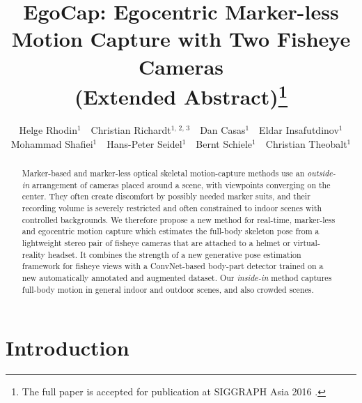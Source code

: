 \documentclass[runningheads]{llncs}
\begin{document}
%
%
%
\pagestyle{headings}
\mainmatter

\title{EgoCap: Egocentric Marker-less Motion Capture with Two Fisheye Cameras\\(Extended Abstract)\thanks{The full paper is accepted for publication at SIGGRAPH Asia 2016 \cite{Rhodin:2016egotrack}.}} %



\author{
		Helge Rhodin$^\text{1}$ \,\,
		Christian Richardt$^\text{1, 2, 3}$ \,\,
		Dan Casas$^\text{1}$ \,\,
		Eldar Insafutdinov$^\text{1}$ \\
		Mohammad Shafiei$^\text{1}$ \,\,
		Hans-Peter Seidel$^\text{1}$ \,\,
		Bernt Schiele$^\text{1}$ \,\,
		Christian Theobalt$^\text{1}$}

%
%
%
%



\maketitle



\begin{abstract}
Marker-based and marker-less optical skeletal motion-cap\-ture methods use an \emph{outside-in} arrangement of cameras placed around a scene, with viewpoints converging on the center. 
They often create discomfort by possibly needed marker suits, and their recording volume is severely restricted and often constrained to indoor scenes with controlled backgrounds. 
We therefore propose a new method for real-time, marker-less and egocentric motion capture which estimates the full-body skeleton pose from a lightweight stereo pair of fisheye cameras that are attached to a helmet or virtual-reality headset.
It combines the strength of a new generative pose estimation framework for fisheye views with a ConvNet-based body-part detector trained on a new automatically annotated and augmented dataset.
Our \emph{inside-in} method captures full-body motion in general indoor and outdoor scenes, and also crowded scenes.

%
%
%
%
%
%
%
%
%
\end{abstract}


\section{Introduction}
\end{document}

